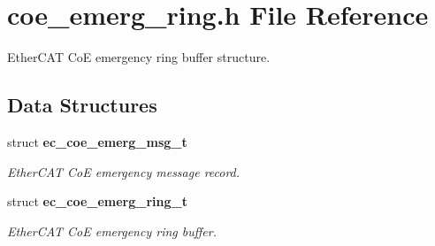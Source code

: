 \section{coe\-\_\-emerg\-\_\-ring.\-h File Reference}
\label{coe__emerg__ring_8h}


Ether\-C\-A\-T Co\-E emergency ring buffer structure.  


\subsection*{Data Structures}
\begin{DoxyCompactItemize}
\item 
struct {\bf ec\-\_\-coe\-\_\-emerg\-\_\-msg\-\_\-t}
\begin{DoxyCompactList}\small\item\em Ether\-C\-A\-T Co\-E emergency message record. \end{DoxyCompactList}\item 
struct {\bf ec\-\_\-coe\-\_\-emerg\-\_\-ring\-\_\-t}
\begin{DoxyCompactList}\small\item\em Ether\-C\-A\-T Co\-E emergency ring buffer. \end{DoxyCompactList}\end{DoxyCompactItemize}
